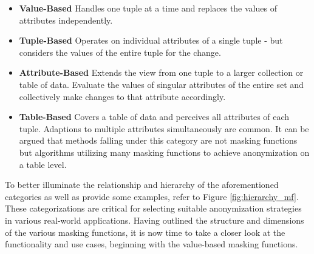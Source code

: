 \begin{itemize}
    \item \textbf{Value-Based} Handles one tuple at a time and replaces the values of attributes independently. 
    \item \textbf{Tuple-Based} Operates on individual attributes of a single tuple - but considers the values of the entire tuple for the change. 
    \item \textbf{Attribute-Based} Extends the view from one tuple to a larger collection or table of data. Evaluate the values of singular attributes of the entire set and collectively make changes to that attribute accordingly. 
    \item \textbf{Table-Based} Covers a table of data and perceives all attributes of each tuple. Adaptions to multiple attributes simultaneously are common. It can be argued that methods falling under this category are not masking functions but algorithms utilizing many masking functions to achieve anonymization on a table level.  
\end{itemize}

To better illuminate the relationship and hierarchy of the aforementioned categories as well as provide some examples, refer to Figure \ref{fig:hierarchy_mf}. These categorizations are critical for selecting suitable anonymization strategies in various real-world applications. Having outlined the structure and dimensions of the various masking functions, it is now time to take a closer look at the functionality and use cases, beginning with the value-based masking functions. 

